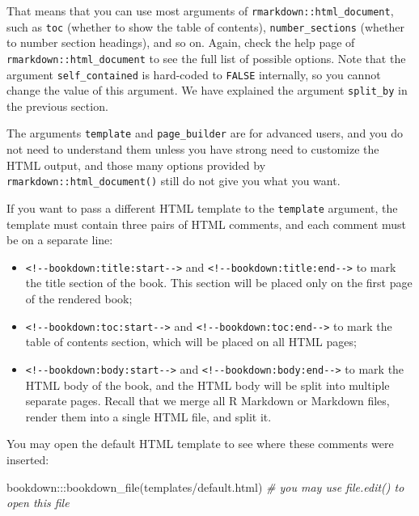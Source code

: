 \documentclass[
  12pt,
]{krantz}
\newenvironment{Shaded}{\begin{snugshade}}{\end{snugshade}}
\newcommand{\CommentTok}[1]{\textcolor[rgb]{0.56,0.35,0.01}{\textit{#1}}}
\newcommand{\FunctionTok}[1]{\textcolor[rgb]{0.00,0.00,0.00}{#1}}
\newcommand{\NormalTok}[1]{#1}
\newcommand{\SpecialCharTok}[1]{\textcolor[rgb]{0.00,0.00,0.00}{#1}}
\newcommand{\StringTok}[1]{\textcolor[rgb]{0.31,0.60,0.02}{#1}}
\providecommand{\tightlist}{%
  \setlength{\itemsep}{0pt}\setlength{\parskip}{0pt}}
\theoremstyle{definition}
\theoremstyle{definition}
\theoremstyle{definition}
\theoremstyle{definition}
\theoremstyle{remark}
\begin{document}
That means that you can use most arguments of \texttt{rmarkdown::html\_document}, such as \texttt{toc} (whether to show the table of contents), \texttt{number\_sections} (whether to number section headings), and so on. Again, check the help page of \texttt{rmarkdown::html\_document} to see the full list of possible options. Note that the argument \texttt{self\_contained} is hard-coded to \texttt{FALSE} internally, so you cannot change the value of this argument. We have explained the argument \texttt{split\_by} in the previous section.

The arguments \texttt{template} and \texttt{page\_builder} are for advanced users, and you do not need to understand them unless you have strong need to customize the HTML output, and those many options provided by \texttt{rmarkdown::html\_document()} still do not give you what you want.

If you want to pass a different HTML template to the \texttt{template} argument, the template must contain three pairs of HTML comments, and each comment must be on a separate line:

\begin{itemize}
\tightlist
\item
  \texttt{\textless{}!-\/-bookdown:title:start-\/-\textgreater{}} and \texttt{\textless{}!-\/-bookdown:title:end-\/-\textgreater{}} to mark the title section of the book. This section will be placed only on the first page of the rendered book;
\item
  \texttt{\textless{}!-\/-bookdown:toc:start-\/-\textgreater{}} and \texttt{\textless{}!-\/-bookdown:toc:end-\/-\textgreater{}} to mark the table of contents section, which will be placed on all HTML pages;
\item
  \texttt{\textless{}!-\/-bookdown:body:start-\/-\textgreater{}} and \texttt{\textless{}!-\/-bookdown:body:end-\/-\textgreater{}} to mark the HTML body of the book, and the HTML body will be split into multiple separate pages. Recall that we merge all R Markdown or Markdown files, render them into a single HTML file, and split it.
\end{itemize}

You may open the default HTML template to see where these comments were inserted:

\begin{Shaded}
\begin{Highlighting}[]
\NormalTok{bookdown}\SpecialCharTok{:::}\FunctionTok{bookdown\_file}\NormalTok{(}\StringTok{\textquotesingle{}templates/default.html\textquotesingle{}}\NormalTok{)}
\CommentTok{\# you may use file.edit() to open this file}
\end{Highlighting}
\end{Shaded}
\end{document}
